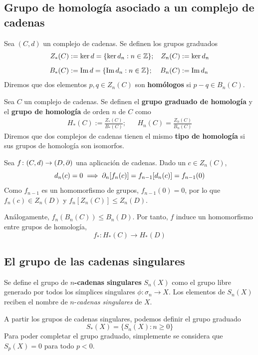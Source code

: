 \subsection{Grupo de homología asociado a un complejo de cadenas}
Sea $(C,d)$ un complejo de cadenas. Se definen los grupos graduados
\begin{align*}
Z_*(C)&:=\ker d=\{\ker d_n: n \in \mathbb{Z}\};	& Z_n(C)&:=\ker d_n\\[0.2cm]
B_*(C)&:=\operatorname{Im} d=\{\operatorname{Im} d_n: n \in \mathbb{Z}\}; 	& B_n(C)&:=\operatorname{Im} d_n
\end{align*}
Diremos que dos elementos $p,q \in Z_n(C)$ son \textbf{homólogos} si
$p-q \in B_n(C)$.

\begin{definition}
Sea $C$ un complejo de cadenas. Se definen el \textbf{grupo graduado de
homología} y el \textbf{grupo de homología} de orden $n$ de $C$ como 
\begin{align*}
H_*(C):=\frac{Z_*(C)}{B_*(C)}; && H_n(C)=\frac{Z_n(C)}{B_n(C)}
\end{align*}
Diremos que dos complejos de cadenas tienen el mismo \textbf{tipo de homología}
si sus grupos de homología son isomorfos.
\end{definition}

Sea $f\colon (C,d) \to (D,\partial)$ una aplicación de cadenas. Dado un
$c \in Z_n(C)$,
\[d_n(c)=0 \implies \partial_n[f_n(c)]=f_{n-1}[d_n(c)]=f_{n-1}(0)\]
Como $f_{n-1}$ es un homomorfismo de grupos, $f_{n-1}(0)=0$, por lo que
$f_n(c)\in Z_n(D)$ y $f_n[Z_n(C)]\leq Z_n(D)$.

Análogamente, $f_n(B_n(C)) \leq B_n(D)$. Por tanto, $f$ induce un homomorfismo
entre grupos de homología,
\[f_*\colon H_*(C) \to H_*(D)\]

\subsection{El grupo de las cadenas singulares}
\begin{definition}
Se define el grupo de \textbf{$n$-cadenas
singulares} $S_n(X)$ como el grupo libre generado por todos los símplices
singulares $\phi\colon \sigma_n \to X$. Los elementos de $S_n(X)$
reciben el nombre de $n$-\emph{cadenas singulares} de $X$.
\end{definition}

A partir los grupos de cadenas singulares, podemos definir el grupo graduado
\[S_*(X)=\{S_n(X): n \geq 0\}\]
Para poder completar el grupo graduado, simplemente se considera que $S_p(X)=0$
para todo $p < 0$.

